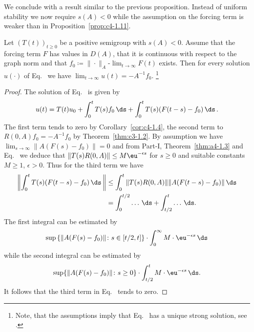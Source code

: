 We conclude with a result similar to the previous proposition.
Instead of uniform stability we now require $s(A) < 0$ while the assumption on the forcing term is weaker than in Proposition~\ref{prop:c4-1.11}.
\begin{proposition}\label{prop:c4-1.12}
Let $(T(t))_{t \geq 0}$ be a positive semigroup with $s(A) < 0$.
Assume that the forcing term $F$ has values in $D(A)$, that it is continuous with respect to the graph norm and that $f_{0} \coloneq  \|\cdot\|_{A}$-$\lim_{t \to \infty} F(t)$ exists.
Then for every solution $u(\cdot)$ of Eq.~ we have $\lim_{t \to \infty} u(t) = -A^{-1}f_{0}$.
\footnote{Note, that the assumptions imply that Eq.~ has a unique strong solution, see \textcite[ Theorem~4.2.4]{pazy:1983}.}
\end{proposition}
\begin{proof}
The solution of Eq.~ is given by
\begin{equation}\label{eq:c4-1.8}
u(t) = T(t)u_{0} + \int_{0}^{t} T(s)f_{0} \, \ds + \int_{0}^{t} T(s)(F(t-s)-f_{0}) \, \ds\,.
\end{equation}
The first term tends to zero by Corollary~\ref{cor:c4-1.4},  
the second term to $R(0,A)f_{0} = -A^{-1}f_{0}$ by Theorem~\ref{thm:c3-1.2}.
By assumption we have $\lim_{s \to \infty}\|A(F(s)-f_{0})\| = 0$ and from Part-I,
Theorem~\ref{thm:a4-1.3} and Eq.~ we deduce that $\|T(s)R(0,A)\| \leq M\eu^{-\epsilon s}$ for $s \geq 0$ and suitable constants $M \geq 1$, $\epsilon > 0$.
Thus for the third term we have
\begin{align*}
 \left\|\int_{0}^{t} T(s)(F(t-s)-f_{0}) \, \ds\,\right\| &\leq \int_{0}^{t} \|T(s)R(0,A)\| \|A(F(t-s)-f_{0})\| \, \ds \\
&= \int_{0}^{t/2} \ldots \, \ds + \int_{t/2}^{t} \ldots \, \ds.
\end{align*}
The first integral can be estimated by
\[
 \sup  \left\{\|A(F(s)-f_{0})\| \colon s \in 
 \left[ t/2 , t \right] \right\} 
\cdot \int_{0}^{\infty} M \cdot \eu^{-\epsilon s} \, \ds
\]
while the second integral can be estimated by 
\[
\sup\{\|A(F(s)-f_{0})\| \colon s \geq 0\}
\cdot \int_{t/2}^{t} M \cdot \eu^{- \epsilon s} \, \ds.
\]
It follows that the third term in Eq.~ tends to zero.
\end{proof}
\clearpage
